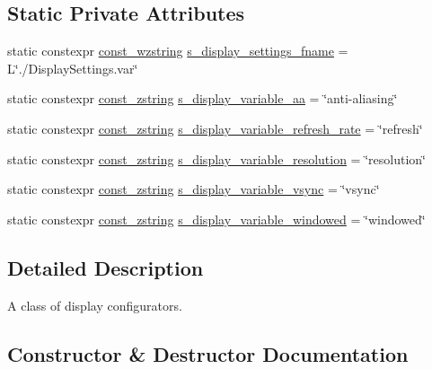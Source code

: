 \subsection*{Static Private Attributes}
\begin{DoxyCompactItemize}
\item 
static constexpr \hyperlink{namespacemage_ac409e0f2a22292a3a4cd42742994fbf0}{const\+\_\+wzstring} \hyperlink{classmage_1_1rendering_1_1_display_configurator_1_1_impl_a2ead8221b0659d05699de6ef4d3c0ba4}{s\+\_\+display\+\_\+settings\+\_\+fname} = L\char`\"{}./Display\+Settings.\+var\char`\"{}
\item 
static constexpr \hyperlink{namespacemage_abfd9206dc607ceb5d13ec68bf075a5c0}{const\+\_\+zstring} \hyperlink{classmage_1_1rendering_1_1_display_configurator_1_1_impl_a017dade5658f0a4fa0a56fec2fe30d52}{s\+\_\+display\+\_\+variable\+\_\+aa} = \char`\"{}anti-\/aliasing\char`\"{}
\item 
static constexpr \hyperlink{namespacemage_abfd9206dc607ceb5d13ec68bf075a5c0}{const\+\_\+zstring} \hyperlink{classmage_1_1rendering_1_1_display_configurator_1_1_impl_ae8cb7050d662cc3e5cd6ff97465517a6}{s\+\_\+display\+\_\+variable\+\_\+refresh\+\_\+rate} = \char`\"{}refresh\char`\"{}
\item 
static constexpr \hyperlink{namespacemage_abfd9206dc607ceb5d13ec68bf075a5c0}{const\+\_\+zstring} \hyperlink{classmage_1_1rendering_1_1_display_configurator_1_1_impl_af9c853047964698a8810e71bf4483a10}{s\+\_\+display\+\_\+variable\+\_\+resolution} = \char`\"{}resolution\char`\"{}
\item 
static constexpr \hyperlink{namespacemage_abfd9206dc607ceb5d13ec68bf075a5c0}{const\+\_\+zstring} \hyperlink{classmage_1_1rendering_1_1_display_configurator_1_1_impl_aee0b8c95b78b2e63655c3f294b56504b}{s\+\_\+display\+\_\+variable\+\_\+vsync} = \char`\"{}vsync\char`\"{}
\item 
static constexpr \hyperlink{namespacemage_abfd9206dc607ceb5d13ec68bf075a5c0}{const\+\_\+zstring} \hyperlink{classmage_1_1rendering_1_1_display_configurator_1_1_impl_a9d3c183714f56deaa9e55160c478bb27}{s\+\_\+display\+\_\+variable\+\_\+windowed} = \char`\"{}windowed\char`\"{}
\end{DoxyCompactItemize}


\subsection{Detailed Description}
A class of display configurators. 

\subsection{Constructor \& Destructor Documentation}
\hypertarget{classmage_1_1rendering_1_1_display_configurator_1_1_impl_a0aa85d25b294d8ecec7fc83d4a6d80e2}{}\label{classmage_1_1rendering_1_1_display_configurator_1_1_impl_a0aa85d25b294d8ecec7fc83d4a6d80e2} 
